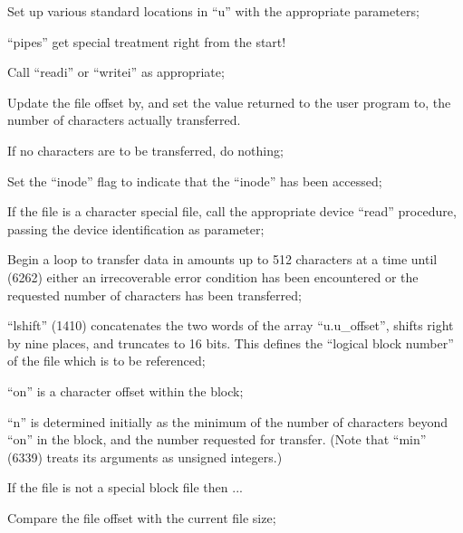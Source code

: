 \item[5743:] Set up various standard locations
 in ``u'' with the appropriate
 parameters;

\item[5746:] ``pipes'' get special treatment
 right from the start!

\item[5755:] Call ``readi'' or ``writei'' as
 appropriate;

 \item[5756:] Update the file offset by, and
set the value returned to the
user program to, the number of
characters actually transferred.
\ed


\bd
\item[6230:] If no characters are to be
transferred, do nothing;

\item[6232:] Set the ``inode'' flag to indicate
that the ``inode'' has been accessed;

\item[6233:] If the file is a character special file, call the appropriate
 device ``read'' procedure, passing
 the device identification as
 parameter;

\item[6238:] Begin a loop to transfer data in
 amounts up to 512 characters at a
 time until (6262) either an irrecoverable error condition has
 been encountered or the requested
 number of characters has been
 transferred;

\item[6239:] ``lshift'' (1410) concatenates the
 two words of the array
 ``u.u\_offset'', shifts right by
 nine places, and truncates to 16
 bits. This defines the ``logical
block number'' of the file which
is to be referenced;

\item[6240:] ``on'' is a character offset within
 the block;

\item[6241:] ``n'' is determined initially as
the minimum of the number of
characters beyond ``on'' in the
block, and the number requested
for transfer. (Note that ``min''
(6339) treats its arguments as
unsigned integers.)

\item[6242:] If the file is not a special
 block file then ...

\item[6243:] Compare the file offset with the
 current file size;

